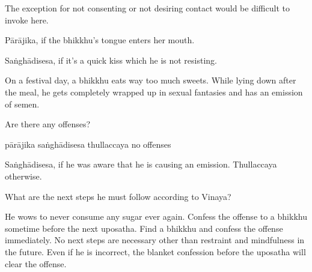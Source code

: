 \begin{exam}{\autoExamName}
\begin{problem}
  \begin{solution}
    The exception for not consenting or not desiring contact would be difficult to invoke here.

    Pārājika, if the bhikkhu's tongue enters her mouth.

    Saṅghādisesa, if it's a quick kiss which he is not resisting.
  \end{solution}

\end{problem}

\problemDivide

\begin{problem*}

  On a festival day, a bhikkhu eats way too much sweets.
  While lying down after the meal, he gets completely wrapped up in sexual fantasies and has an emission of semen.

  \bigskip

  \begin{parts}

  \item Are there any offenses?

  \bigskip

  \begin{answers}{4}
    \bChoices
     pārājika\eAns
     saṅghādisesa\eAns
     thullaccaya\eAns
     no offenses\eAns
    \eChoices
  \end{answers}

  \begin{solution}
    Saṅghādisesa, if he was aware that he is causing an emission. Thullaccaya otherwise.
  \end{solution}

  \bigskip

  \item What are the next steps he must follow according to Vinaya?

  \bigskip

  \begin{manswers}{1}
    \bChoices
     He wows to never consume any sugar ever again.\eAns
     Confess the offense to a bhikkhu sometime before the next uposatha.\eAns
     Find a bhikkhu and confess the offense immediately.\eAns
     No next steps are necessary other than restraint and mindfulness in the future. Even if he is incorrect, the blanket confession before the uposatha will clear the offense.\eAns
    \eChoices
  \end{manswers}


\end{parts}
\end{problem*}
\end{exam}

